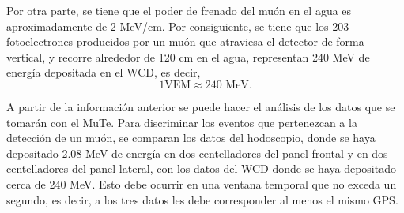\documentclass[12pt,oneside,openany,letter]{book}
\begin{document}
Por otra parte, se tiene que el poder de frenado del muón en el agua es aproximadamente de 2 MeV/cm. Por consiguiente, se tiene que los 203 fotoelectrones producidos por un muón que atraviesa el detector de forma vertical, y recorre alrededor de 120 cm en el agua, representan 240 MeV de energía depositada en el WCD, es decir,
\begin{equation}
1 \text{VEM} \approx 240 \text{ MeV}.   
\end{equation}

A partir de la informaci\'on anterior se puede hacer el an\'alisis de los datos que se tomar\'an con el MuTe. Para discriminar los eventos que pertenezcan a la detecci\'on de un mu\'on, se comparan los datos del hodoscopio, donde se haya depositado 2.08 MeV de energ\'ia en dos centelladores del panel frontal y en dos centelladores del panel lateral, con los datos del WCD donde se haya depositado cerca de 240 MeV. Esto debe ocurrir en una ventana temporal que no exceda un segundo, es decir, a los tres datos les debe corresponder al menos el mismo GPS.
\end{document}
